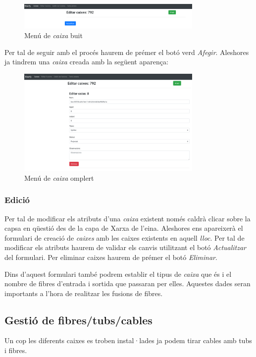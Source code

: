 \documentclass[a4paper]{article}
\begin{document}
	\begin{figure}[H]
		\centering
		\includegraphics[width=0.8\textwidth]{images/boxes_edit_void.png}
		\caption{Menú de \emph{caixa} buit}
	\end{figure}

	Per tal de seguir amb el procés haurem de prémer el botó verd \emph{Afegir}. Aleshores ja tindrem una \emph{caixa} creada amb la següent aparença:
	
	\begin{figure}[H]
		\centering
		\includegraphics[width=0.8\textwidth]{images/boxes_edit_full.png}
		\caption{Menú de \emph{caixa} omplert}
	\end{figure}

	
	\subsubsection{Edició}
	Per tal de modificar els atributs d'una \emph{caixa} existent només caldrà clicar sobre la capsa en qüestió des de la capa de Xarxa de l'eina. Aleshores ens apareixerà el formulari de creació de \emph{caixes} amb les caixes existents en aquell \emph{lloc}. Per tal de modificar els atributs haurem de validar els canvis utilitzant el botó \emph{Actualitzar} del formulari. Per eliminar caixes haurem de prémer el botó \emph{Eliminar}.
	
	Dins d'aquest formulari també podrem establir el tipus de \emph{caixa} que és i el nombre de fibres d'entrada i sortida que passaran per elles. Aquestes dades seran importants a l'hora de realitzar les fusions de fibres.
	
	\subsection{Gestió de fibres/tubs/cables}
	Un cop les diferents caixes es troben instal·lades ja podem tirar cables amb tubs i fibres.
	
\end{document}
